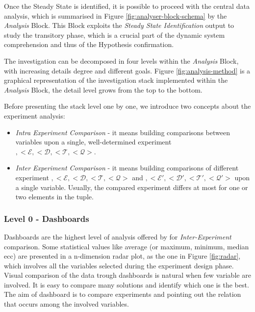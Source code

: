 Once the Steady State is identified, it is possible to proceed with the central data analysis, which is summarised in Figure \ref{fig:analyser-block-schema} by the \textit{Analysis} Block. This Block exploits the \textit{Steady State Identification} output to study the transitory phase, which is a crucial part of the dynamic system comprehension and thus of the Hypothesis confirmation.

The investigation can be decomposed in four levels within the \textit{Analysis} Block, with increasing details degree and different goals.  Figure \ref{fig:analysis-method} is a graphical representation of the investigation stack implemented within the \textit{Analysis} Block, the detail level grows from the top to the bottom.

Before presenting the stack level one by one, we introduce two concepts about the experiment analysis:
\begin{itemize}
\item \textit{Intra Experiment Comparison} -  it means building comparisons between variables upon a single, well-determined experiment $,<\mathcal{E},<\mathcal{D},<\mathcal{T},<\mathcal{Q}>$.
\item \textit{Inter Experiment Comparison} -  it means building comparisons of different experiment 
$,<\mathcal{E},<\mathcal{D},<\mathcal{T},<\mathcal{Q}>$ and $,<\mathcal{E}',<\mathcal{D}',<\mathcal{T}',<\mathcal{Q}'>$ upon a single variable. Usually, the compared experiment differs at most for one or two elements in the tuple. 
\end{itemize}


\subsubsection{Level 0 - Dashboards}\label{sec:heaven-level0}

Dashboards are the highest level of analysis offered by \name for \textit{Inter-Experiment} comparison. Some statistical values like average (or maximum, minimum, median ecc) are presented in a n-dimension radar plot, as the one in Figure \ref{fig:radar}, which involves all the variables selected during the experiment design phase. Visual comparison of the data trough dashboards is natural when few variable are involved. It is easy to compare many solutions and identify which one is the best. The aim of dashboard is to compare experiments and pointing out the relation that occurs among the involved variables.

